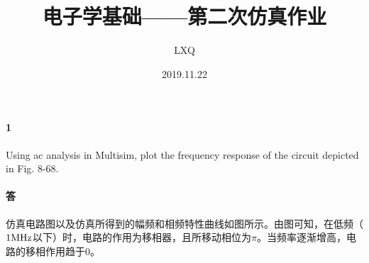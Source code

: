 \documentclass[hyperref, UTF8]{ctexart}
\title{电子学基础——第二次仿真作业}
\author{LXQ}
\date{2019.11.22}
\newcommand{\megahertz}{{\rm MHz}}
\begin{document}
\maketitle

\paragraph{1} Using ac analysis in Multisim, plot the frequency response of the circuit depicted in Fig. 8-68.

\paragraph{答}
仿真电路图以及仿真所得到的幅频和相频特性曲线如图所示。由图可知，在低频（$1\megahertz$以下）时，电路的作用为移相器，且所移动相位为$\pi$。当频率逐渐增高，电路的移相作用趋于$0$。
\end{document}
